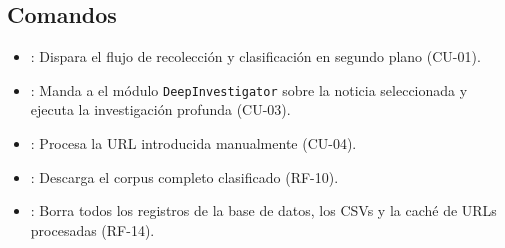 \subsection{Comandos}
	\begin{itemize}
		\item {}: Dispara el flujo de recolección y
		      clasificación en segundo plano (CU-01).
		\item {}: Manda a el módulo \texttt{DeepInvestigator} sobre la noticia
		      seleccionada y ejecuta la investigación profunda (CU-03).
		\item {}: Procesa la URL introducida manualmente (CU-04).
		\item {}: Descarga el corpus completo clasificado (RF-10).
		\item {}: Borra todos los registros de la base de datos,
		      los CSVs y la caché de URLs procesadas (RF-14).
	\end{itemize}
 
